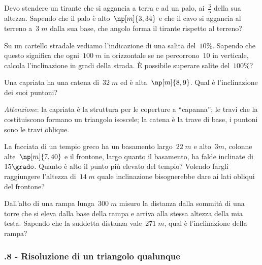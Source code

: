 \begin{multicols}{2}
\begin{esercizio}[\Ast]
\label{ese:G.63}
Devo stendere un tirante che si aggancia a terra e ad un palo, ai~$\frac{3}{5}$ della sua altezza.
Sapendo che il palo è alto~$\np[m]{3,34}$ e che il cavo si aggancia al terreno a~$3\;\unit{m}$ dalla sua base,
che angolo forma il tirante rispetto al terreno?
\end{esercizio}

\begin{esercizio}[\Ast]
\label{ese:G.64}
Su un cartello stradale vediamo l'indicazione di una salita del~$10\%$. Sapendo che questo significa che ogni~$100\;\unit{m}$
in orizzontale se ne percorrono~$10$ in verticale, calcola l'inclinazione in gradi della strada. È possibile superare salite del~$100\%$?
\end{esercizio}

\begin{esercizio}[\Ast]
\label{ese:G.65}
Una capriata ha una catena di~$32\;\unit{m}$ ed è alta~$\np[m]{8,9}$. Qual è l'inclinazione dei suoi puntoni?

\emph{Attenzione}: la capriata è la struttura per le coperture a ``capanna''; le travi che la costituiscono
formano un triangolo isoscele; la catena è la trave di base, i puntoni sono le travi oblique.
\end{esercizio}

\begin{esercizio}[\Ast]
\label{ese:G.66}
La facciata di un tempio greco ha un basamento largo~$22\;\unit{m}$ e alto~$3\unit{m}$, colonne alte~$\np[m]{7,40}$ e il frontone,
largo quanto il basamento, ha falde inclinate di~$15\grado$. Quanto è alto il punto più elevato del tempio?
Volendo fargli raggiungere l'altezza di~$14\;\unit{m}$ quale inclinazione bisognerebbe dare ai lati obliqui del frontone?
\end{esercizio}

\begin{esercizio}[\Ast]
\label{ese:G.67}
Dall'alto di una rampa lunga~$300\;\unit{m}$ misuro la distanza dalla sommità di una torre che si eleva dalla base della rampa e arriva
alla stessa altezza della mia testa. Sapendo che la suddetta distanza vale~$271\;\unit{m}$, qual è l'inclinazione della rampa?
\end{esercizio}
\end{multicols}

\subsubsection*{\thechapter.8 - Risoluzione di un triangolo qualunque}

